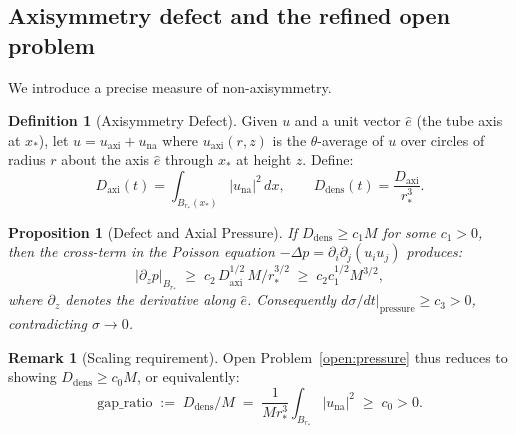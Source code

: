 \documentclass[11pt]{article}
\newtheorem{proposition}[theorem]{Proposition}
\theoremstyle{definition}
\newtheorem{definition}[theorem]{Definition}
\newtheorem{remark}[theorem]{Remark}
\theoremstyle{remark}
\begin{document}
\subsection{Axisymmetry defect and the refined open problem}

We introduce a precise measure of non-axisymmetry.

\begin{definition}[Axisymmetry Defect]\label{def:D-axi}
  Given $u$ and a unit vector $\hat{e}$ (the tube axis at $x_*$), let
  $u = u_{\mathrm{axi}} + u_{\mathrm{na}}$ where $u_{\mathrm{axi}}(r,z)$ is the
  $\theta$-average of $u$ over circles of radius $r$ about the axis $\hat{e}$
  through $x_*$ at height $z$.  Define:
  \[
    D_{\mathrm{axi}}(t) = \int_{B_{r_*}(x_*)} |u_{\mathrm{na}}|^2 \,dx,
    \qquad
    D_{\mathrm{dens}}(t) = \frac{D_{\mathrm{axi}}}{r_*^3}.
  \]
\end{definition}

\begin{proposition}[Defect and Axial Pressure]\label{prop:defect-pressure}
  If $D_{\mathrm{dens}} \ge c_1 M$ for some $c_1 > 0$, then the cross-term
  in the Poisson equation $-\Delta p = \partial_i\partial_j(u_iu_j)$ produces:
  \[
    |\partial_z p|_{B_{r_*}} \;\ge\; c_2\,D_{\mathrm{axi}}^{1/2}\,M / r_*^{3/2}
    \;\ge\; c_2 c_1^{1/2} M^{3/2},
  \]
  where $\partial_z$ denotes the derivative along $\hat{e}$.
  Consequently $d\sigma/dt|_{\mathrm{pressure}} \ge c_3 > 0$,
  contradicting $\sigma \to 0$.
\end{proposition}

\begin{remark}[Scaling requirement]
  Open Problem~\ref{open:pressure} thus reduces to showing
  $D_{\mathrm{dens}} \ge c_0 M$, or equivalently:
  \[
    \text{gap\_ratio} \;:=\; D_{\mathrm{dens}} / M
    \;=\; \frac{1}{M r_*^3}\int_{B_{r_*}}|u_{\mathrm{na}}|^2
    \;\ge\; c_0 > 0.
  \]
\end{remark}
\end{document}
